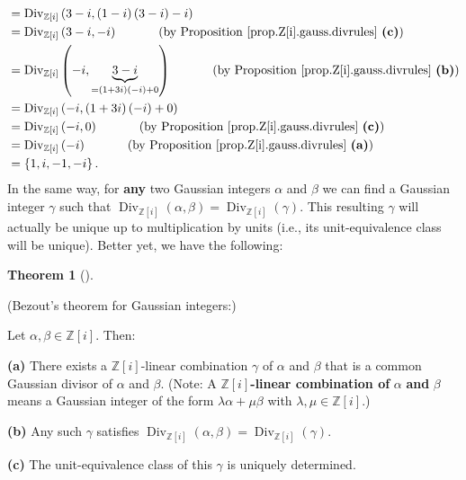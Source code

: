 \documentclass[numbers=enddot,12pt,final,onecolumn,notitlepage]{scrartcl}%
\numberwithin{exer}{subsection}
\theoremstyle{definition}
\newtheorem{theo}{Theorem}[subsection]
\newenvironment{theorem}[1][]
{\begin{theo}[#1]\begin{leftbar}}
{\end{leftbar}\end{theo}}
\begin{document}
\begin{align*}
&  =\operatorname*{Div}\nolimits_{\mathbb{Z}\left[  i\right]  }\left(
3-i,\left(  1-i\right)  \left(  3-i\right)  -i\right) \\
&  =\operatorname*{Div}\nolimits_{\mathbb{Z}\left[  i\right]  }\left(
3-i,-i\right)  \ \ \ \ \ \ \ \ \ \ \left(  \text{by Proposition
\ref{prop.Z[i].gauss.divrules} \textbf{(c)}}\right) \\
&  =\operatorname*{Div}\nolimits_{\mathbb{Z}\left[  i\right]  }\left(
-i,\underbrace{3-i}_{=\left(  1+3i\right)  \left(  -i\right)  +0}\right)
\ \ \ \ \ \ \ \ \ \ \left(  \text{by Proposition
\ref{prop.Z[i].gauss.divrules} \textbf{(b)}}\right) \\
&  =\operatorname*{Div}\nolimits_{\mathbb{Z}\left[  i\right]  }\left(
-i,\left(  1+3i\right)  \left(  -i\right)  +0\right) \\
&  =\operatorname*{Div}\nolimits_{\mathbb{Z}\left[  i\right]  }\left(
-i,0\right)  \ \ \ \ \ \ \ \ \ \ \left(  \text{by Proposition
\ref{prop.Z[i].gauss.divrules} \textbf{(c)}}\right) \\
&  =\operatorname*{Div}\nolimits_{\mathbb{Z}\left[  i\right]  }\left(
-i\right)  \ \ \ \ \ \ \ \ \ \ \left(  \text{by Proposition
\ref{prop.Z[i].gauss.divrules} \textbf{(a)}}\right) \\
&  =\left\{  1,i,-1,-i\right\}  .
\end{align*}
In the same way, for \textbf{any} two Gaussian integers $\alpha$ and $\beta$
we can find a Gaussian integer $\gamma$ such that $\operatorname*{Div}%
\nolimits_{\mathbb{Z}\left[  i\right]  }\left(  \alpha,\beta\right)
=\operatorname*{Div}\nolimits_{\mathbb{Z}\left[  i\right]  }\left(
\gamma\right)  $. This resulting $\gamma$ will actually be unique up to
multiplication by units (i.e., its unit-equivalence class will be unique).
Better yet, we have the following:

\begin{theorem}
\label{thm.Z[i].gauss.bezout}(Bezout's theorem for Gaussian integers:)

Let $\alpha,\beta\in\mathbb{Z}\left[  i\right]  $. Then:

\textbf{(a)} There exists a $\mathbb{Z}\left[  i\right]  $-linear combination
$\gamma$ of $\alpha$ and $\beta$ that is a common Gaussian divisor of $\alpha$
and $\beta$. (Note: A $\mathbb{Z}\left[  i\right]  $\textbf{-linear
combination of }$\alpha$ \textbf{and }$\beta$ means a Gaussian integer of the
form $\lambda\alpha+\mu\beta$ with $\lambda,\mu\in\mathbb{Z}\left[  i\right]
$.)

\textbf{(b)} Any such $\gamma$ satisfies $\operatorname*{Div}%
\nolimits_{\mathbb{Z}\left[  i\right]  }\left(  \alpha,\beta\right)
=\operatorname*{Div}\nolimits_{\mathbb{Z}\left[  i\right]  }\left(
\gamma\right)  $.

\textbf{(c)} The unit-equivalence class of this $\gamma$ is uniquely determined.
\end{theorem}
\end{document}
